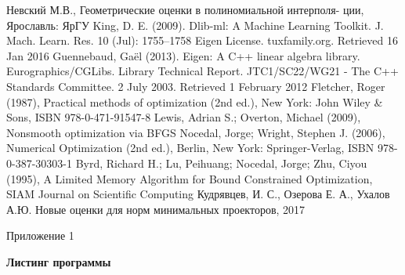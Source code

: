 \documentclass[12pt, a4paper]{extarticle}
\begin{document}
\newpage
\begin{thebibliography}{1}
Невский М.В., Геометрические оценки в полиномиальной интерполя-
ции, Ярославль: ЯрГУ
King, D. E. (2009). Dlib-ml: A Machine Learning Toolkit. J. Mach. Learn. Res. 10 (Jul): 1755–1758
Eigen License. tuxfamily.org. Retrieved 16 Jan 2016
Guennebaud, Gaël (2013). Eigen: A C++ linear algebra library. Eurographics/CGLibs.
Library Technical Report. JTC1/SC22/WG21 - The C++ Standards Committee. 2 July 2003. Retrieved 1 February 2012
Fletcher, Roger (1987), Practical methods of optimization (2nd ed.), New York: John Wiley \& Sons, ISBN 978-0-471-91547-8
Lewis, Adrian S.; Overton, Michael (2009), Nonsmooth optimization via BFGS
Nocedal, Jorge; Wright, Stephen J. (2006), Numerical Optimization (2nd ed.), Berlin, New York: Springer-Verlag, ISBN 978-0-387-30303-1
Byrd, Richard H.; Lu, Peihuang; Nocedal, Jorge; Zhu, Ciyou (1995), A Limited Memory Algorithm for Bound Constrained Optimization, SIAM Journal on Scientific Computing
	Кудрявцев, И. С., Озерова Е. А., Ухалов А.Ю. Новые оценки для норм минимальных проекторов, 2017


\end{thebibliography}
\newpage
\begin{flushright}
Приложение 1
\end{flushright}
\begin{center}
	{\bf Листинг программы }
\end{center}
\end{document}
